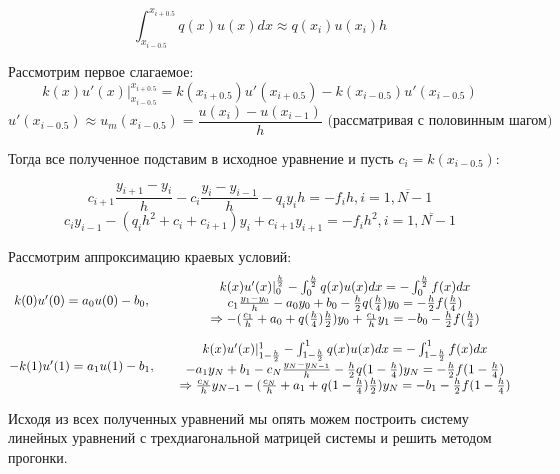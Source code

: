 \documentclass[a4paper]{article}
\begin{document}
	$$
	\int_{x_{i-0.5}}^{x_{i+0.5}} q(x) u(x) dx \approx
	q(x_i) u(x_i) h
	$$
	
	Рассмотрим первое слагаемое:
	$$ 
	k(x) u'(x)\Big|_{x_{i-0.5}}^{x_{i+0.5}} =
	k(x_{i+0.5}) u'(x_{i+0.5}) - k(x_{i-0.5}) u'(x_{i-0.5})
	$$
	$$ 	u'(x_{i-0.5}) \approx u_m(x_{i-0.5}) = \frac{u(x_{i}) - u(x_{i-1})}{h} \text{ (рассматривая с половинным шагом)} $$
	
	Тогда все полученное подставим в исходное уравнение и пусть $ c_i =  k(x_{i - 0.5}) $:
	\begin{large}
		$$ 
		c_{i + 1} \frac{y_{i+1} - y_i}{h} -
		c_{i} \frac{y_i - y_{i-1}}{h} -
		q_i y_i h = - f_i h, 
		i = \overline{1, N-1}
		$$
		$$ 
		c_i y_{i-1} -
		(q_i h^2 + c_i + c_{i+1}) y_i +
		c_{i + 1} y_{i+1} = - f_i h^2, 
		i = \overline{1, N-1}
		$$
	\end{large}
	
	Рассмотрим аппроксимацию краевых условий:
	$$
	\begin{matrix}
	\vspace{1em}
	k(0) u'(0) = a_0 u(0) - b_0, &&
	\begin{matrix}
	k(x) u'(x)|_{0}^{\frac{h}{2}} - \int_{0}^{\frac{h}{2}}q(x) u(x) dx = -\int_{0}^{\frac{h}{2}} f(x) dx \\
	c_1 \frac{y_1 - y_0}{h} - a_0 y_0 + b_0 -
	\frac{h}{2} q(\frac{h}{4}) y_0 =
	-\frac{h}{2} f(\frac{h}{4}) \\
	\Rightarrow -(\frac{c_1}{h} + a_0 + q(\frac{h}{4}) \frac{h}{2}) y_0 +
	\frac{c_1}{h} y_1 = -b_0 - \frac{h}{2} f(\frac{h}{4})
	\end{matrix} \\
	-k(1) u'(1) = a_1 u(1) - b_1, &&
	\begin{matrix}
	k(x) u'(x)|_{1-\frac{h}{2}}^{1} - \int_{1-\frac{h}{2}}^{1} q(x) u(x) dx = -\int_{1-\frac{h}{2}}^{1} f(x) dx \\
	-a_1 y_N + b_1 -c_N \frac{y_N - y_{N-1}}{h} -
	\frac{h}{2} q(1 - \frac{h}{4}) y_N = 
	-\frac{h}{2} f(1 - \frac{h}{4}) \\
	\Rightarrow \frac{c_N}{h} y_{N-1} -
	(\frac{c_N}{h} + a_1 + q(1 - \frac{h}{4})\frac{h}{2} ) y_N =
	- b_1 -\frac{h}{2} f(1 - \frac{h}{4})
	\end{matrix} \\
	\end{matrix}
	$$
	
	Исходя из всех полученных уравнений мы опять можем построить систему линейных уравнений с трехдиагональной матрицей системы и решить методом прогонки.
	
\end{document}
